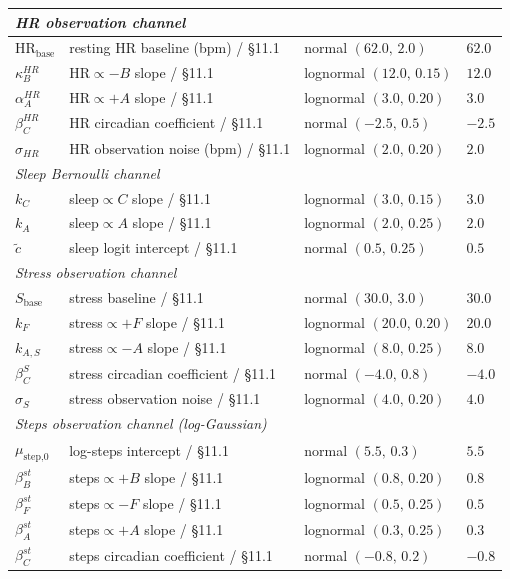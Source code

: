 \begin{center}
\begin{tabular}{llll}
\midrule
\multicolumn{4}{l}{\textit{HR observation channel}} \\
\midrule
$\text{HR}_\text{base}$ & resting HR baseline (bpm) / §11.1 & normal $(62.0,\,2.0)$ & $62.0$ \\
$\kappa_B^{HR}$ & HR$\propto -B$ slope / §11.1 & lognormal $(12.0,\,0.15)$ & $12.0$ \\
$\alpha_A^{HR}$ & HR$\propto +A$ slope / §11.1 & lognormal $(3.0,\,0.20)$ & $3.0$ \\
$\beta_C^{HR}$ & HR circadian coefficient / §11.1 & normal $(-2.5,\,0.5)$ & $-2.5$ \\
$\sigma_{HR}$ & HR observation noise (bpm) / §11.1 & lognormal $(2.0,\,0.20)$ & $2.0$ \\
\midrule
\multicolumn{4}{l}{\textit{Sleep Bernoulli channel}} \\
\midrule
$k_C$ & sleep$\propto C$ slope / §11.1 & lognormal $(3.0,\,0.15)$ & $3.0$ \\
$k_A$ & sleep$\propto A$ slope / §11.1 & lognormal $(2.0,\,0.25)$ & $2.0$ \\
$\tilde c$ & sleep logit intercept / §11.1 & normal $(0.5,\,0.25)$ & $0.5$ \\
\midrule
\multicolumn{4}{l}{\textit{Stress observation channel}} \\
\midrule
$S_\text{base}$ & stress baseline / §11.1 & normal $(30.0,\,3.0)$ & $30.0$ \\
$k_F$ & stress$\propto +F$ slope / §11.1 & lognormal $(20.0,\,0.20)$ & $20.0$ \\
$k_{A,S}$ & stress$\propto -A$ slope / §11.1 & lognormal $(8.0,\,0.25)$ & $8.0$ \\
$\beta_C^{S}$ & stress circadian coefficient / §11.1 & normal $(-4.0,\,0.8)$ & $-4.0$ \\
$\sigma_S$ & stress observation noise / §11.1 & lognormal $(4.0,\,0.20)$ & $4.0$ \\
\midrule
\multicolumn{4}{l}{\textit{Steps observation channel (log-Gaussian)}} \\
\midrule
$\mu_\text{step,0}$ & log-steps intercept / §11.1 & normal $(5.5,\,0.3)$ & $5.5$ \\
$\beta_B^{st}$ & steps$\propto +B$ slope / §11.1 & lognormal $(0.8,\,0.20)$ & $0.8$ \\
$\beta_F^{st}$ & steps$\propto -F$ slope / §11.1 & lognormal $(0.5,\,0.25)$ & $0.5$ \\
$\beta_A^{st}$ & steps$\propto +A$ slope / §11.1 & lognormal $(0.3,\,0.25)$ & $0.3$ \\
$\beta_C^{st}$ & steps circadian coefficient / §11.1 & normal $(-0.8,\,0.2)$ & $-0.8$ \\

\end{tabular}
\end{center}
